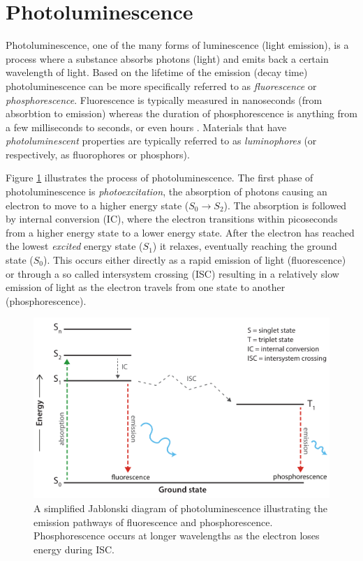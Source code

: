 \documentclass[thesis.tex]{subfiles}
\begin{document}
\section{Photoluminescence}
\label{section:photoluminescence}
\enlargethispage{2\baselineskip}
Photoluminescence, one of the many forms of luminescence (light emission), is a process where a substance absorbs photons (light) and emits back a certain wavelength of light. Based on the lifetime of the emission (decay time) photoluminescence can be more specifically referred to as \emph{fluorescence} or \emph{phosphorescence}. Fluorescence is typically measured in nanoseconds (from absorbtion to emission) whereas the duration of phosphorescence is anything from a few milliseconds to seconds, or even hours \cite{luminescence_basics}. Materials that have \emph{photoluminescent} properties are typically referred to as \emph{luminophores} (or respectively, as fluorophores or phosphors).

Figure \ref{figure:photoluminescence} illustrates the process of photoluminescence. The first phase of photoluminescence is \emph{photoexcitation}, the absorption of photons causing an electron to move to a higher energy state ($S_0 \rightarrow S_2$). The absorption is followed by internal conversion (IC), where the electron transitions within picoseconds from a higher energy state to a lower energy state. After the electron has reached the lowest \emph{excited} energy state ($S_1$) it relaxes, eventually reaching the ground state ($S_0$). This occurs either directly as a rapid emission of light (fluorescence) or through a so called intersystem crossing (ISC) resulting in a relatively slow emission of light as the electron travels from one state to another (phosphorescence).

\begin{figure}[h!]
\centering \includegraphics[width=\textwidth]{images/photoluminescence.pdf}
\vspace{-8mm}
\caption{A simplified Jablonski diagram of photoluminescence illustrating the emission pathways of fluorescence and phosphorescence. Phosphorescence occurs at longer wavelengths as the electron loses energy during ISC. \label{figure:photoluminescence}}
\end{figure}
\end{document}
